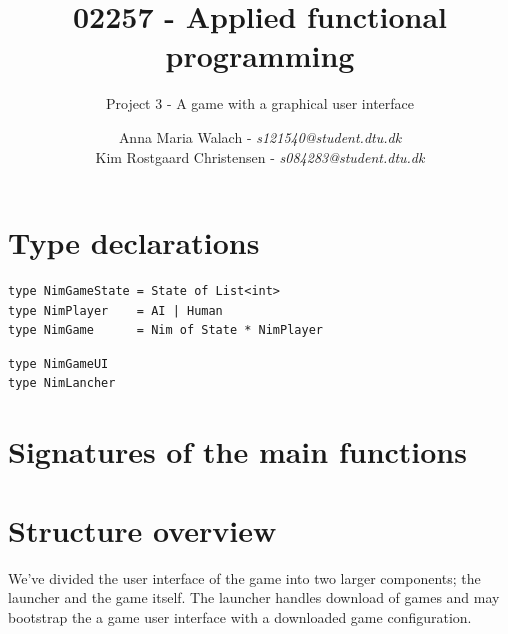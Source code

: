 \documentclass[10pt]{scrartcl}
\title{02257 - Applied functional programming}
\subtitle{Project 3 - A game with a graphical user interface}
\author{Anna Maria Walach - \textit {s121540@student.dtu.dk} \\ Kim Rostgaard Christensen - \textit {s084283@student.dtu.dk}}
\begin{document}
\maketitle
\section{Type declarations}
\begin{lstlisting}
type NimGameState = State of List<int>
type NimPlayer    = AI | Human
type NimGame      = Nim of State * NimPlayer
\end{lstlisting}

\begin{lstlisting}
type NimGameUI
type NimLancher
\end{lstlisting}

\section{Signatures of the main functions}


\section{Structure overview}
We've divided the user interface of the game into two larger components; the launcher and the game itself. The launcher handles download of games and may bootstrap the a game user interface with a downloaded game configuration.
\end{document}
